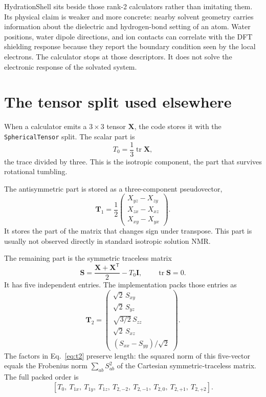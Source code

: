 \documentclass[11pt]{article}
\begin{document}
HydrationShell sits beside those rank-2 calculators rather than imitating them.
Its physical claim is weaker and more concrete: nearby solvent geometry carries
information about the dielectric and hydrogen-bond setting of an atom. Water
positions, water dipole directions, and ion contacts can correlate with the DFT
shielding response because they report the boundary condition seen by the local
electrons. The calculator stops at those descriptors. It does not solve the
electronic response of the solvated system.

\section{The tensor split used elsewhere}

When a calculator emits a \(3\times3\) tensor \(\bm X\), the code stores it with
the \texttt{SphericalTensor} split. The scalar part is
\begin{equation}
  T_0 = \frac{1}{3}\operatorname{tr}\bm X ,
  \label{eq:t0}
\end{equation}
the trace divided by three. This is the isotropic component, the part that
survives rotational tumbling.

The antisymmetric part is stored as a three-component pseudovector,
\begin{equation}
  \bm T_1 =
  \frac{1}{2}
  \begin{pmatrix}
    X_{yz}-X_{zy}\\
    X_{zx}-X_{xz}\\
    X_{xy}-X_{yx}
  \end{pmatrix}.
  \label{eq:t1}
\end{equation}
It stores the part of the matrix that changes sign under transpose. This part is
usually not observed directly in standard isotropic solution NMR.

The remaining part is the symmetric traceless matrix
\begin{equation}
  \bm S=\frac{\bm X+\bm X^{\mathsf T}}{2}-T_0\bm I,
  \qquad \operatorname{tr}\bm S=0 .
  \label{eq:s}
\end{equation}
It has five independent entries. The implementation packs those entries as
\begin{equation}
  \bm T_2 =
  \begin{pmatrix}
    \sqrt{2}\,S_{xy}\\
    \sqrt{2}\,S_{yz}\\
    \sqrt{3/2}\,S_{zz}\\
    \sqrt{2}\,S_{xz}\\
    (S_{xx}-S_{yy})/\sqrt{2}
  \end{pmatrix}.
  \label{eq:t2}
\end{equation}
The factors in Eq.~\eqref{eq:t2} preserve length: the squared norm of this
five-vector equals the Frobenius norm \(\sum_{ab}S_{ab}^2\) of the Cartesian
symmetric-traceless matrix. The full packed order is
\[
  [T_0,\ T_{1x},\ T_{1y},\ T_{1z},\
   T_{2,-2},\ T_{2,-1},\ T_{2,0},\ T_{2,+1},\ T_{2,+2}] .
\]
\end{document}
